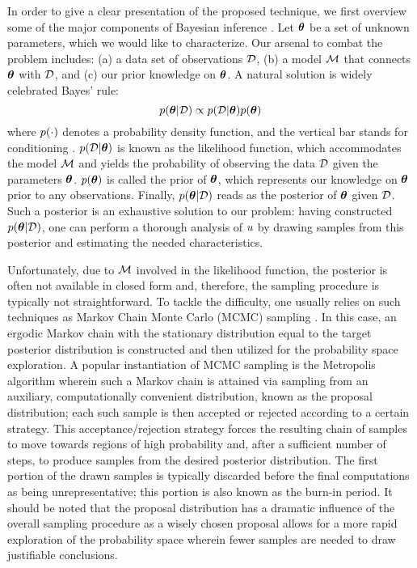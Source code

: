In order to give a clear presentation of the proposed technique, we first overview some of the major components of Bayesian inference \cite{gelman2004}.
Let ${\boldsymbol\theta}$ be a set of unknown parameters, which we would like to characterize. Our arsenal to combat the problem includes: (a) a data set of observations $\mathcal{D}$, (b) a model $\model$ that connects ${\boldsymbol\theta}$ with $\mathcal{D}$, and (c) our prior knowledge on ${\boldsymbol\theta}$. A natural solution is widely celebrated Bayes' rule:
\[
  \f{\vparam | \Data} \propto \f{\Data | \vparam} \f{\vparam}
\]
where $\f{\cdot}$ denotes a probability density function, and the vertical bar stands for conditioning \cite{durrett2010}.
$\f{\Data | \vparam}$ is known as the likelihood function, which accommodates the model $\model$ and yields the probability of observing the data $\mathcal{D}$ given the parameters ${\boldsymbol\theta}$.
$\f{\vparam}$ is called the prior of ${\boldsymbol\theta}$, which represents our knowledge on ${\boldsymbol\theta}$ prior to any observations.
Finally, $\f{\vparam | \Data}$ reads as the posterior of ${\boldsymbol\theta}$ given $\mathcal{D}$. Such a posterior is an exhaustive solution to our problem: having constructed $\f{\vparam | \Data}$, one can perform a thorough analysis of $u$ by drawing samples from this posterior and estimating the needed characteristics.

Unfortunately, due to $\model$ involved in the likelihood function, the posterior is often not available in closed form and, therefore, the sampling procedure is typically not straightforward.
To tackle the difficulty, one usually relies on such techniques as Markov Chain Monte Carlo (MCMC) sampling \cite{gelman2004}. In this case, an ergodic Markov chain with the stationary distribution equal to the target posterior distribution is constructed and then utilized for the probability space exploration.
A popular instantiation of MCMC sampling is the Metropolis algorithm wherein such a Markov chain is attained via sampling from an auxiliary, computationally convenient distribution, known as the proposal distribution; each such sample is then accepted or rejected according to a certain strategy. This acceptance/rejection strategy forces the resulting chain of samples to move towards regions of high probability and, after a sufficient number of steps, to produce samples from the desired posterior distribution. The first portion of the drawn samples is typically discarded before the final computations as being unrepresentative; this portion is also known as the burn-in period. It should be noted that the proposal distribution has a dramatic influence of the overall sampling procedure as a wisely chosen proposal allows for a more rapid exploration of the probability space wherein fewer samples are needed to draw justifiable conclusions.
